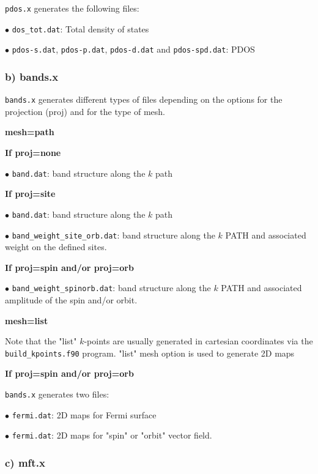\documentclass[12pt, onecolumn]{memoir}
\begin{document}
\noindent
\verb+pdos.x+ generates the following files:


$\bullet$ \verb+dos_tot.dat+: Total density of states

$\bullet$
\verb+pdos-s.dat+,  \verb+pdos-p.dat+, \verb+pdos-d.dat+ and \verb+pdos-spd.dat+: PDOS

\subsubsection{b) bands.x}

\noindent
\verb+bands.x+ generates different types of files depending on the options for the projection (proj) and for the type of mesh. 

\begin{center}
{\color{blue}\textbf{mesh=path}  }
\end{center}

\textbf{If proj=none}

$\bullet$
\verb+band.dat+: band structure along the $k$ path

\textbf{If proj=site}

$\bullet$
\verb+band.dat+: band structure along the $k$ path

$\bullet$
\verb+band_weight_site_orb.dat+: band structure along the $k$ PATH and associated weight on the defined sites.

\textbf{If proj=spin and/or proj=orb}

$\bullet$
\verb+band_weight_spinorb.dat+: band structure along the $k$ PATH and associated amplitude of the spin and/or orbit.


\begin{center}
{\color{blue}\textbf{mesh=list}  }
\end{center}

\noindent
Note that the "list" $k$-points are usually generated in cartesian coordinates via the \verb+build_kpoints.f90+ program. "list" mesh option is used to generate 2D maps

\textbf{If proj=spin and/or proj=orb}

\noindent
\verb+bands.x+ generates two files:

$\bullet$ \verb+fermi.dat+: 2D maps for Fermi surface

$\bullet$ \verb+fermi.dat+: 2D maps for "spin" or "orbit" vector field.

\subsubsection{c) mft.x}
\end{document}
